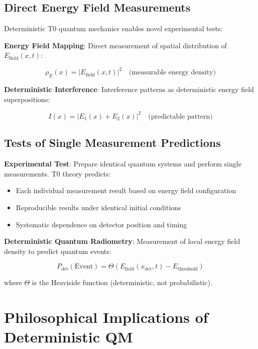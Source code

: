 \documentclass[12pt,a4paper]{article}
\theoremstyle{definition}
\theoremstyle{remark}
\begin{document}
	\subsection{Direct Energy Field Measurements}
	
	Deterministic T0 quantum mechanics enables novel experimental tests:
	
	\textbf{Energy Field Mapping}:
	Direct measurement of spatial distribution of $E_{\text{field}}(x,t)$:
	
	\begin{equation}
		\rho_E(x) = |E_{\text{field}}(x,t)|^2 \quad \text{(measurable energy density)}
	\end{equation}
	
	\textbf{Deterministic Interference}:
	Interference patterns as deterministic energy field superpositions:
	
	\begin{equation}
		I(x) = |E_1(x) + E_2(x)|^2 \quad \text{(predictable pattern)}
	\end{equation}
	
	\subsection{Tests of Single Measurement Predictions}
	
	\textbf{Experimental Test}: Prepare identical quantum systems and perform single measurements. T0 theory predicts:
	
	\begin{itemize}
		\item Each individual measurement result based on energy field configuration
		\item Reproducible results under identical initial conditions
		\item Systematic dependence on detector position and timing
	\end{itemize}
	
	\textbf{Deterministic Quantum Radiometry}:
	Measurement of local energy field density to predict quantum events:
	
	\begin{equation}
		P_{\text{det}}(\text{Event}) = \Theta\left(E_{\text{field}}(x_{\text{det}}, t) - E_{\text{threshold}}\right)
	\end{equation}
	
	where $\Theta$ is the Heaviside function (deterministic, not probabilistic).
	
	\section{Philosophical Implications of Deterministic QM}
	
\end{document}
